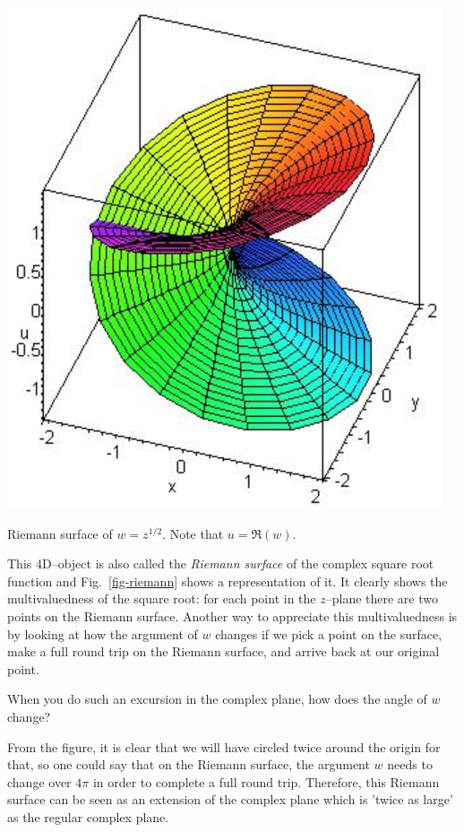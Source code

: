 \begin{marginfigure}[-3cm]
\centering
\includegraphics{complex/figures/riemann}
\caption{Riemann surface of $w=z^{1/2}$. Note that $u=\Re(w)$. }
\label{fig-riemann}
\end{marginfigure}

This 4D--object is also called the \emph{Riemann surface} of the complex square root function and Fig.~\ref{fig-riemann} shows a representation of it. It clearly shows the multivaluedness of the square root: for each point in the $z$--plane there are two points on the Riemann surface. Another way to appreciate this multivaluedness is by looking at how the argument of $w$ changes if we pick a point on the surface, make a full round trip on the Riemann surface, and arrive back at our original point.

\begin{cue}
When you do such an excursion in the complex plane, how does the angle of $w$ change? 
\end{cue}

From the figure, it is clear that we will have circled twice around the origin for that, so one could say that on the Riemann surface, the argument $w$ needs to change over $4 \pi$ in order to complete a full round trip. Therefore, this Riemann surface can be seen as an extension of the complex plane which is 'twice as large' as the regular complex plane.

